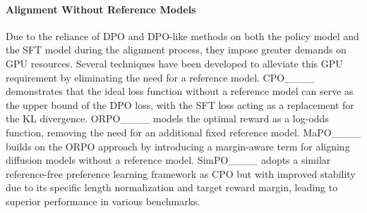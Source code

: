 \paragraph{Alignment Without Reference Models} Due to the reliance of DPO and DPO-like methods on both the policy model and the SFT model during the alignment process, they impose greater demands on GPU resources. Several techniques have been developed to alleviate this GPU requirement by eliminating the need for a reference model. CPO____ demonstrates that the ideal loss function without a reference model can serve as the upper bound of the DPO loss, with the SFT loss acting as a replacement for the KL divergence. ORPO____ models the optimal reward as a log-odds function, removing the need for an additional fixed reference model. MaPO____ builds on the ORPO approach by introducing a margin-aware term for aligning diffusion models without a reference model. SimPO____ adopts a similar reference-free preference learning framework as CPO but with improved stability due to its specific length normalization and target reward margin, leading to superior performance in various benchmarks.